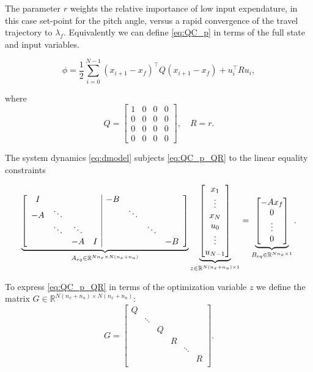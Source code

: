 The parameter $r$ weights the relative importance of low input expendature, in this case set-point for the pitch angle, versus a rapid convergence of the travel trajectory to $\lambda_f$.  Equivalently we can define \eqref{eq:QC_p} in terms of the full state and input variables.

\begin{equation}
	\label{eq:QC_p_QR}
	\phi = \frac{1}{2}\sum_{i=0}^{N-1} (x_{i+1}-x_f)^\top Q (x_{i+1}-x_f) + u_i^\top R u_i,
\end{equation}

where
\begin{equation*}
Q = \begin{bmatrix}1&0&0&0\\0&0&0&0\\0&0&0&0\\0&0&0&0\end{bmatrix}, \quad R = r.
\end{equation*}

The system dynamics \eqref{eq:dmodel} subjects \eqref{eq:QC_p_QR} to the linear equality constraints

\begin{equation}
	\label{eq:eq_constraints}
	\underbrace{
	\left[\begin{array}{cccc | ccccc}
	I	&&&&			-B	&&&			\\
	-A	&\ddots&&&			&\ddots&&	\\
		&\ddots&\ddots&&	&&\ddots&	\\
		&& -A & I&			&&& -B		\\
\end{array}\right]}_{A_{eq} \in \mathbb{R}^{Nn_x \times N(n_x+n_u)}}
\underbrace{
\begin{bmatrix} x_1 \\ \vdots \\ x_N \\ u_0 \\ \vdots \\ u_{N-1} \end{bmatrix}}_{z \in \mathbb{R}^{N(n_x+n_u)\times 1}}
=
\underbrace{
\begin{bmatrix}
-A x_f \\ 0 \\ \vdots \\ 0      
\end{bmatrix}}_{B_{eq}\in \mathbb{R}^{Nn_x \times 1}}.
\end{equation}

To express \eqref{eq:QC_p_QR} in terms of the optimization variable $z$ we define the matrix $G \in \mathbb{R}^{N(n_x+n_u) \times N(n_x + n_u)}$:
\begin{equation*}
	G =
	\begin{bmatrix}
	Q	&&&&&		\\
		&\ddots&&&&	\\
		&&Q&&&		\\
		&&&R&&		\\
		&&&&\ddots&	\\
		&&&&&R		\\
	\end{bmatrix}.
\end{equation*}

